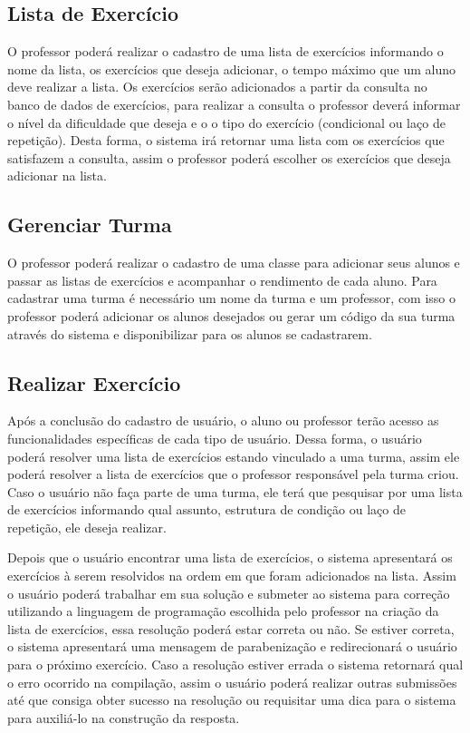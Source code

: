 \subsection{Lista de Exercício}

O professor poderá realizar o cadastro de uma lista de exercícios informando o nome da lista, os exercícios que deseja adicionar, o tempo máximo que um aluno deve realizar a lista. Os exercícios serão adicionados a partir da consulta no banco de dados de exercícios, para realizar a consulta o professor deverá informar o nível da dificuldade que deseja e o o tipo do exercício (condicional ou laço de repetição). Desta forma, o sistema irá retornar uma lista com os exercícios que satisfazem a consulta, assim o professor poderá escolher os exercícios que deseja adicionar na lista.

\subsection{Gerenciar Turma}

O professor poderá realizar o cadastro de uma classe para adicionar seus alunos e passar as listas de exercícios e acompanhar o rendimento de cada aluno. Para cadastrar uma turma é necessário um nome da turma e um professor, com isso o professor poderá adicionar os alunos desejados ou gerar um código da sua turma através do sistema e disponibilizar para os alunos se cadastrarem.

\subsection{Realizar Exercício}

Após a conclusão do cadastro de usuário, o aluno ou professor terão acesso as funcionalidades específicas de cada tipo de usuário. Dessa forma, o usuário poderá resolver uma lista de exercícios estando vinculado a uma turma, assim ele poderá resolver a lista de exercícios que o professor responsável pela turma criou. Caso o usuário não faça parte de uma turma, ele terá que pesquisar por uma lista de exercícios informando qual assunto, estrutura de condição ou laço de repetição, ele deseja realizar. 

Depois que o usuário encontrar uma lista de exercícios, o sistema apresentará os exercícios à serem resolvidos na ordem em que foram adicionados na lista. Assim o usuário poderá trabalhar em sua solução e submeter ao sistema para correção utilizando a linguagem de programação escolhida pelo professor na criação da lista de exercícios, essa resolução poderá estar correta ou não. Se estiver correta, o sistema apresentará uma mensagem de parabenização e redirecionará o usuário para o próximo exercício. Caso a resolução estiver errada o sistema retornará qual o erro ocorrido na compilação, assim o usuário poderá realizar outras submissões até que consiga obter sucesso na resolução ou requisitar uma dica para o sistema para auxiliá-lo na construção da resposta. 


